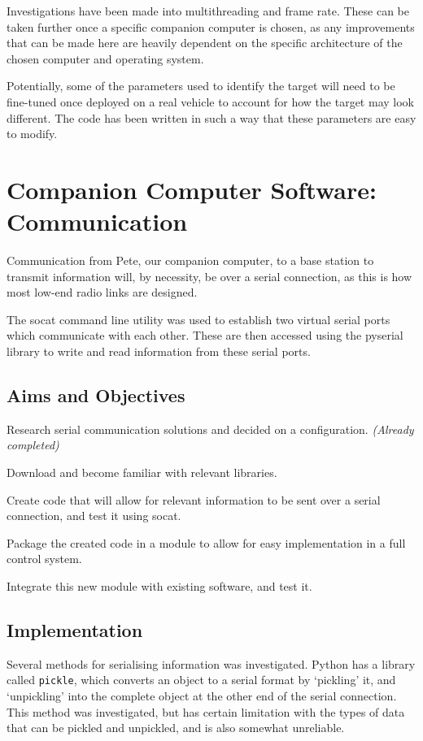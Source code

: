 \documentclass[11pt,twoside]{article}
\begin{document}
Investigations have been made into multithreading and frame rate. These can be taken further once a specific companion computer is chosen, as any improvements that can be made here are heavily dependent on the specific architecture of the chosen computer and operating system.

Potentially, some of the parameters used to identify the target will need to be fine-tuned once deployed on a real vehicle to account for how the target may look different. The code has been written in such a way that these parameters are easy to modify.

\section{Companion Computer Software: Communication}
Communication from Pete, our companion computer, to a base station to transmit information will, by necessity, be over a serial connection, as this is how most low-end radio links are designed.

The socat\cite{socat} command line utility was used to establish two virtual serial ports which communicate with each other. These are then accessed using the pyserial library to write and read information from these serial ports.

\subsection{Aims and Objectives}
\begin{compactenum}
    \item Research serial communication solutions and decided on a configuration. \emph{(Already completed)}
    \item Download and become familiar with relevant libraries.
    \item Create code that will allow for relevant information to be sent over a serial connection, and test it using socat.
    \item Package the created code in a module to allow for easy implementation in a full control system.
    \item Integrate this new module with existing software, and test it.
\end{compactenum}


\subsection{Implementation}
Several methods for serialising information was investigated. Python has a library called \lstinline|pickle|, which converts an object to a serial format by `pickling' it, and `unpickling' into the complete object at the other end of the serial connection. This method was investigated, but has certain limitation with the types of data that can be pickled and unpickled, and is also somewhat unreliable.
\end{document}

